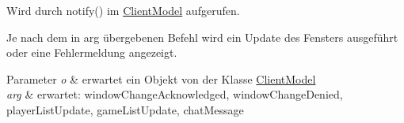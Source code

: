 Wird durch notify() im \hyperlink{a00013}{Client\-Model} aufgerufen. 

Je nach dem in arg übergebenen Befehl wird ein Update des Fensters ausgeführt oder eine Fehlermeldung angezeigt.


\begin{DoxyParams}{Parameter}
{\em o} & erwartet ein Objekt von der Klasse \hyperlink{a00013}{Client\-Model} \\
\hline
{\em arg} & erwartet\-: window\-Change\-Acknowledged, window\-Change\-Denied, player\-List\-Update, game\-List\-Update, chat\-Message \\
\hline
\end{DoxyParams}
